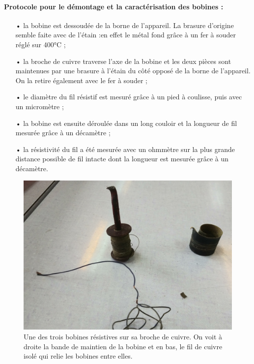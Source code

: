 \documentclass[12pt,a4paper,fleqn]{article}
\begin{document}
\paragraph{Protocole pour le démontage et la caractérisation des bobines :}
\begin{itemize}
\item[•] la bobine est dessoudée de la borne de l'appareil.
La brasure d'origine semble faite avec de l'étain :en effet le métal fond grâce à un fer à souder réglé sur 400°C ;
\item[•] la broche de cuivre traverse l'axe de la bobine et les deux pièces sont maintenues par une brasure à l'étain du côté opposé de la borne de l'appareil.
On la retire également avec le fer à souder ;
\item[•] le diamètre du fil résistif est mesuré grâce à un pied à coulisse, puis avec un micromètre ;
\item[•] la bobine est ensuite déroulée dans un long couloir et la longueur de fil mesurée grâce à un décamètre ;
\item[•] la résistivité du fil a été mesurée avec un ohmmètre sur la plus grande distance possible de fil intacte dont la longueur est mesurée grâce à un décamètre.
\end{itemize}

\begin{figure}[htbp]
    \center
    \includegraphics[height=300 pt]{images/20210311_150656.jpg}
    \caption{Une des trois bobines résistives sur sa broche de cuivre.
    On voit à droite la bande de maintien de la bobine et en bas, le fil de cuivre isolé qui relie les bobines entre elles.}
    \label{fig:bobine}
\end{figure}
\end{document}
